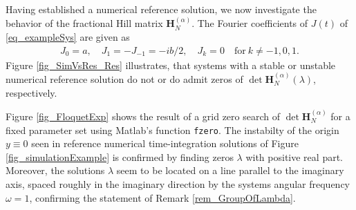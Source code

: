\documentclass{svproc}
\newcommand{\hMat}{\mathbf H}
\begin{document}
{		{ Having established a numerical reference solution, we now investigate the behavior of the fractional Hill matrix $\hMat_{N}^{(\alpha)}$. The Fourier coefficients of $J(t)$ of \eqref{eq_exampleSys} are given as
				\begin{align}
						J_0 = a,\quad J_1 = -J_{-1} = -ib/2,\quad J_k =0\quad \mathrm{for}~k\neq -1,0,1.
					\end{align} Figure \ref{fig_SimVsRes_Res} illustrates, that systems with a stable or unstable numerical reference solution do not or do admit zeros of $\det \hMat_{N}^{(\alpha)}(\lambda)$, respectively.}
		
		Figure \ref{fig_FloquetExp} shows the result of a grid zero search of $\det \hMat_{N}^{(\alpha)}$ for a fixed parameter set using Matlab's function \texttt{fzero}. The instabilty of the origin $y\equiv 0$ seen in reference numerical time-integration solutions of Figure \ref{fig_simulationExample} is confirmed by finding zeros $\lambda$ with positive real part. Moreover, the solutions $\lambda$ seem to be located on a line parallel to the imaginary axis, spaced roughly in the imaginary direction by the systems angular frequency $\omega =1$, confirming the statement of Remark \ref{rem_GroupOfLambda}.
		}
		
\end{document}
